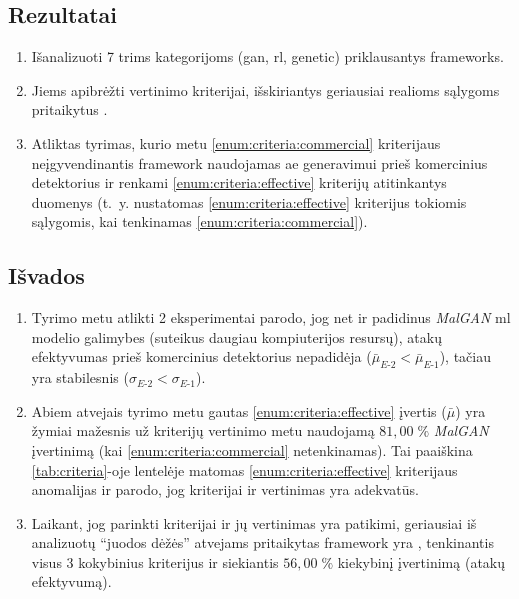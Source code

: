 
\subsection*{Rezultatai}
\begin{enumerate}
    \item Išanalizuoti 7 trims kategorijoms (\acs{gan}, \acs{rl}, \acs{genetic}) priklausantys  \glspl{framework}. 
    \item Jiems apibrėžti vertinimo kriterijai, išskiriantys geriausiai realioms sąlygoms pritaikytus .
    \item Atliktas tyrimas, kurio metu \ref{enum:criteria:commercial} kriterijaus neįgyvendinantis \gls{framework}  naudojamas \acs{ae} generavimui prieš komercinius detektorius ir renkami \ref{enum:criteria:effective} kriterijų atitinkantys duomenys (t.~y. nustatomas  \ref{enum:criteria:effective} kriterijus tokiomis sąlygomis, kai tenkinamas \ref{enum:criteria:commercial}).
\end{enumerate}

\subsection*{Išvados}
\begin{enumerate}
    \item Tyrimo metu atlikti 2 eksperimentai parodo, jog net ir padidinus \textit{MalGAN} \acs{ml} modelio galimybes (suteikus daugiau kompiuterijos resursų), atakų efektyvumas prieš komercinius detektorius nepadidėja ($\bar{\mu}_{E \text{-} 2} < \bar{\mu}_{E \text{-} 1}$), tačiau yra stabilesnis ($\sigma_{E \text{-} 2} < \sigma_{E \text{-} 1}$).
    \item Abiem atvejais tyrimo metu gautas \ref{enum:criteria:effective} įvertis ($\bar{\mu}$) yra žymiai mažesnis už kriterijų vertinimo metu naudojamą $81,00 \; \%$ \textit{MalGAN}  įvertinimą (kai \ref{enum:criteria:commercial} netenkinamas). Tai paaiškina \ref{tab:criteria}-oje lentelėje matomas \ref{enum:criteria:effective} kriterijaus anomalijas ir parodo, jog kriterijai ir  vertinimas yra adekvatūs.
    \item Laikant, jog parinkti kriterijai ir jų vertinimas yra patikimi, geriausiai iš analizuotų  \enquote{juodos dėžės} atvejams pritaikytas \gls{framework} yra , tenkinantis visus 3 kokybinius kriterijus ir siekiantis $56,00 \; \%$ kiekybinį įvertinimą (atakų efektyvumą).
\end{enumerate}
